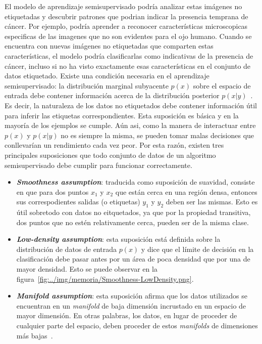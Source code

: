 El modelo de aprendizaje semisupervisado podría analizar estas imágenes no etiquetadas y descubrir patrones que podrian indicar la presencia temprana de cáncer. Por ejemplo, podría aprender a reconocer características microscopicas especificas de las imagenes que no son evidentes para el ojo humano. Cuando se encuentra con nuevas imágenes no etiquetadas que comparten estas características, el modelo podría clasificarlas como indicativas de la presencia de cáncer, incluso si no ha visto exactamente esas características en el conjunto de datos etiquetado.
Existe una condición necesaria en el aprendizaje semisupervisado: la distribución marginal subyacente $p(x)$ sobre el espacio de entrada debe contener información acerca de la distribución posterior $p(x|y)$~\cite{Engelen:semi-supervised}. Es decir, la naturaleza de los datos no etiquetados debe contener información útil para inferir las etiquetas correspondientes.
Esta suposición es básica y en la mayoría de los ejemplos se cumple. Aún asi, como la manera de interactuar entre $p(x)$ y  $p(x|y)$ no es siempre la misma, se pueden tomar malas decisiones que conllevarían un rendimiento cada vez peor. Por esta razón, existen tres principales suposiciones que todo conjunto de datos de un algoritmo semisupervisado debe cumplir para funcionar correctamente.
\begin{itemize}
	\item \textit{\textbf{Smoothness assumption}}: traducida como suposición de suavidad, consiste en que para dos puntos $x_{1}$ y $x_{2}$ que están cerca en una región densa, entonces sus correspodientes salidas (o etiquetas) $y_{1}$ y $y_{2}$ deben ser las mismas. Esto es útil sobretodo con datos no eitquetados, ya que por la propiedad transitiva, dos puntos que no estén relativamente cerca, pueden ser de la misma clase.
	\item \textit{\textbf{Low-density assumption}}: esta suposición está definida sobre la distribución de datos de entrada $p(x)$ y dice que el límite de decisión en la clasificación debe pasar antes por un área de poca densidad que por una de mayor densidad. Esto se puede observar en la figura~\ref{fig:../img/memoria/Smoothness-LowDensity.png}.

	
	\item \textit{\textbf{Manifold assumption}}: esta suposición afirma que los datos utilizados se encuentran en un \textit{manifold} de baja dimensión incrustado en un espacio de mayor dimensión. En otras palabras, los datos, en lugar de proceder de cualquier parte del espacio, deben proceder de estos \textit{manifolds} de dimensiones más bajas~\cite{web:assumptions}.
\end{itemize}

